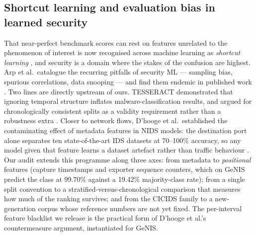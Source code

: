 \documentclass[review,12pt]{elsarticle}
\begin{document}
\subsection{Shortcut learning and evaluation bias in learned security}
That near-perfect benchmark scores can rest on features unrelated to the
phenomenon of interest is now recognised across machine learning as
\emph{shortcut learning} \cite{geirhos2020shortcut}, and security is a
domain where the stakes of the confusion are highest. Arp et al.\ catalogue
the recurring pitfalls of security ML --- sampling bias, spurious
correlations, data snooping --- and find them endemic in published work
\cite{arp2022dodo}. Two lines are directly upstream of ours. TESSERACT
demonstrated that ignoring temporal structure inflates malware-classification
results, and argued for chronologically consistent splits as a validity
requirement rather than a robustness extra \cite{pendlebury2019tesseract}.
Closer to network flows, D'hooge et al.\ established the contaminating
effect of metadata features in NIDS models: the destination port alone
separates ten state-of-the-art IDS datasets at 70--100\% accuracy, so any
model given that feature learns a dataset artefact rather than traffic
behaviour \cite{dhooge2022metadata}. Our audit extends this programme along
three axes: from metadata to \emph{positional} features (capture timestamps
and exporter sequence counters, which on GeNIS predict the class at
99.70\% against a 19.42\% majority-class rate); from a
single split convention to a stratified-versus-chronological comparison that
measures how much of the ranking survives; and from the CICIDS family to a
new-generation corpus whose reference numbers are not yet fixed. The
per-interval feature blacklist we release is the practical form of
D'hooge et al.'s countermeasure argument, instantiated for GeNIS.
\end{document}
